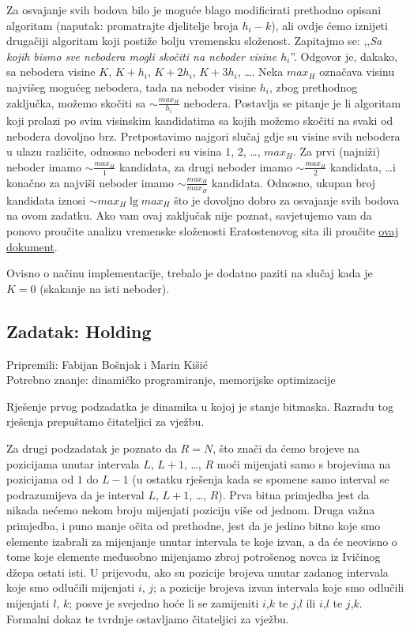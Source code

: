 \documentclass[a4paper]{article}
\begin{document}
Za osvajanje svih bodova bilo je moguće blago modificirati prethodno opisani
algoritam (naputak: promatrajte djelitelje broja $h_i - k$), ali ovdje ćemo
iznijeti drugačiji algoritam koji postiže bolju vremensku složenost. Zapitajmo
se: ,,\textit{Sa kojih bismo sve nebodera mogli skočiti na neboder visine
$h_i$}''.  Odgovor je, dakako, sa nebodera visine $K$, $K + h_i$, $K + 2h_i$,
$K + 3h_i$, \dots.  Neka $max_H$ označava visinu najvišeg mogućeg nebodera,
tada na neboder visine $h_i$, zbog prethodnog zaključka, možemo skočiti sa
$\sim \frac{max_H}{h_i}$ nebodera.  Postavlja se pitanje je li algoritam koji
prolazi po svim visinskim kandidatima sa kojih možemo skočiti na svaki od
nebodera dovoljno brz.  Pretpostavimo najgori slučaj gdje su visine svih
nebodera u ulazu različite, odnosno neboderi su visina $1$, $2$, \dots,
$max_H$. Za prvi (najniži) neboder imamo $\sim \frac{max_H}{1}$ kandidata, za
drugi neboder imamo $\sim \frac{max_H}{2}$ kandidata, \dots i konačno za
najviši neboder imamo $\sim \frac{max_H}{max_H}$ kandidata. Odnosno, ukupan
broj kandidata iznosi $\sim max_H \lg max_H$ što je dovoljno dobro za osvajanje
svih bodova na ovom zadatku. Ako vam ovaj zaključak nije
poznat, savjetujemo vam da ponovo proučite analizu vremenske složenosti
Eratostenovog sita ili proučite
\href{https://www.cs.umd.edu/class/spring2016/cmsc351-0101/harmonic.pdf}{ovaj
dokument}.

Ovisno o načinu implementacije, trebalo je dodatno paziti na slučaj kada je
$K=0$ (skakanje na isti neboder).

\subsection*{Zadatak: Holding}
\textsf{Pripremili: Fabijan Bošnjak i Marin Kišić}\\
\textsf{Potrebno znanje: dinamičko programiranje, memorijske optimizacije}

Rješenje prvog podzadatka je dinamika u kojoj je stanje bitmaska. Razradu tog
rješenja prepuštamo čitateljici za vježbu.

Za drugi podzadatak je poznato da $R = N$, što znači da ćemo brojeve na pozicijama
unutar intervala $L$, $L+1$, \dots, $R$ moći mijenjati samo s brojevima na pozicijama od
$1$ do $L-1$ (u ostatku rješenja kada se spomene samo interval se podrazumijeva da
je interval $L$, $L+1$, \dots, $R$). Prva bitna primjedba jest da nikada nećemo nekom
broju mijenjati poziciju više od jednom. Druga važna primjedba, i puno
manje očita od prethodne, jest da je jedino bitno koje smo elemente izabrali za
mijenjanje unutar intervala te koje izvan, a da će neovisno o tome koje
elemente međusobno mijenjamo zbroj potrošenog novca iz Ivičinog džepa ostati
isti. U prijevodu, ako su pozicije brojeva unutar zadanog intervala koje smo
odlučili mijenjati $i$, $j$; a pozicije brojeva izvan intervala koje smo odlučili
mijenjati $l$, $k$; posve je svejedno hoće li se zamijeniti $i$,$k$ te $j$,$l$ ili $i$,$l$ te
$j$,$k$. Formalni dokaz te tvrdnje ostavljamo čitateljici za vježbu.
\end{document}
